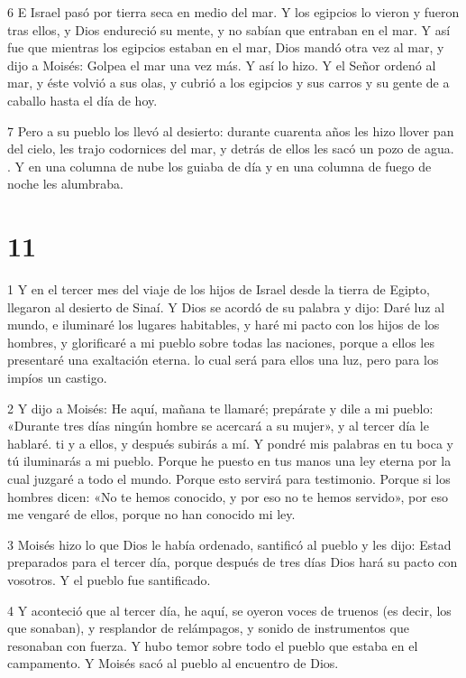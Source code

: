 \par 6 E Israel pasó por tierra seca en medio del mar. Y los egipcios lo vieron y fueron tras ellos, y Dios endureció su mente, y no sabían que entraban en el mar. Y así fue que mientras los egipcios estaban en el mar, Dios mandó otra vez al mar, y dijo a Moisés: Golpea el mar una vez más. Y así lo hizo. Y el Señor ordenó al mar, y éste volvió a sus olas, y cubrió a los egipcios y sus carros y su gente de a caballo hasta el día de hoy.

\par 7 Pero a su pueblo los llevó al desierto: durante cuarenta años les hizo llover pan del cielo, les trajo codornices del mar, y detrás de ellos les sacó un pozo de agua. . Y en una columna de nube los guiaba de día y en una columna de fuego de noche les alumbraba.

\chapter{11}

\par 1 Y en el tercer mes del viaje de los hijos de Israel desde la tierra de Egipto, llegaron al desierto de Sinaí. Y Dios se acordó de su palabra y dijo: Daré luz al mundo, e iluminaré los lugares habitables, y haré mi pacto con los hijos de los hombres, y glorificaré a mi pueblo sobre todas las naciones, porque a ellos les presentaré una exaltación eterna. lo cual será para ellos una luz, pero para los impíos un castigo.

\par 2 Y dijo a Moisés: He aquí, mañana te llamaré; prepárate y dile a mi pueblo: «Durante tres días ningún hombre se acercará a su mujer», y al tercer día le hablaré. ti y a ellos, y después subirás a mí. Y pondré mis palabras en tu boca y tú iluminarás a mi pueblo. Porque he puesto en tus manos una ley eterna por la cual juzgaré a todo el mundo. Porque esto servirá para testimonio. Porque si los hombres dicen: «No te hemos conocido, y por eso no te hemos servido», por eso me vengaré de ellos, porque no han conocido mi ley.

\par 3 Moisés hizo lo que Dios le había ordenado, santificó al pueblo y les dijo: Estad preparados para el tercer día, porque después de tres días Dios hará su pacto con vosotros. Y el pueblo fue santificado.

\par 4 Y aconteció que al tercer día, he aquí, se oyeron voces de truenos (es decir, los que sonaban), y resplandor de relámpagos, y sonido de instrumentos que resonaban con fuerza. Y hubo temor sobre todo el pueblo que estaba en el campamento. Y Moisés sacó al pueblo al encuentro de Dios.

